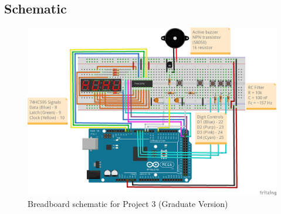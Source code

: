     \subsection*{Schematic}
    \begin{figure}[ht!]
        \caption{Breadboard schematic for Project 3 (Graduate Version)}
        \includegraphics[]{../.secret/project_3_7seg_counter/p3_7seg_counter_grad_bb.png}
    \end{figure}

